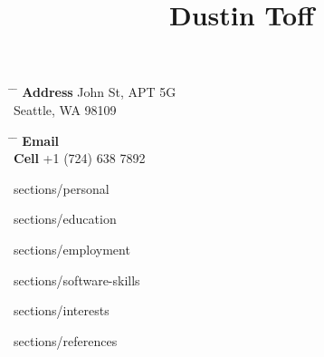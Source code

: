 %
%
%
%

\title {Dustin Toff} %

\parbox {0.5\textwidth} { %
    \begin {tabbing} %
        \hspace{3cm} \= \hspace{4cm} \= \kill %
        {\bf Address}  John St, APT 5G\\ %
        \> Seattle, WA 98109 \\ %
    \end {tabbing}
}
\hfill %
\parbox {0.5\textwidth} { %
    \begin {tabbing} %
        \hspace{3cm} \= \hspace{4cm} \= \kill %
        {\bf Email} \>  \\ %
        {\bf Cell} \> +1 (724) 638 7892 \\ %
    \end {tabbing}
}


 { {sections/personal}}

 { {sections/education}}

 { {sections/employment}}


 { {sections/software-skills}}

 { {sections/interests}}

 { {sections/references}}